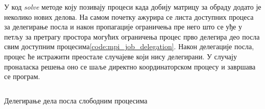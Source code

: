 У код \textit{solve} методе коју позивају процеси када добију матрицу за обраду додато је неколико нових делова. На самом почетку ажурира се листа доступних процеса за делегирање посла и након пропагације ограничења пре него што се уђе у петљу за претрагу простора могућих ограничења процес прво делегира део посла свим доступним процесима\ref{code:mpi_job_delegation}. Након делегације посла, процес ће истражити преостале случајеве који нису делегирани. У случају проналаска решења оно се шаље директно координаторском процесу и завршава се програм.

\begin{listing}[H]
\inputminted{c}{kodovi/mpi_job_delegation.c}
\caption{Делегирање дела посла слободним процесима}
\label{code:mpi_job_delegation}
\end{listing}